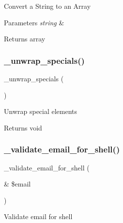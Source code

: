 Convert a String to an Array


\begin{DoxyParams}{Parameters}
{\em string} & \\
\hline
\end{DoxyParams}
\begin{DoxyReturn}{Returns}
array 
\end{DoxyReturn}
\mbox{\label{class_c_i___email_af50bcab235f0eff47d7117d77733f1d9}} 
\subsubsection{\texorpdfstring{\+\_\+unwrap\+\_\+specials()}{\_unwrap\_specials()}}
{\footnotesize\ttfamily \+\_\+unwrap\+\_\+specials (\begin{DoxyParamCaption}{ }\end{DoxyParamCaption})\hspace{0.3cm}{\ttfamily [protected]}}

Unwrap special elements

\begin{DoxyReturn}{Returns}
void 
\end{DoxyReturn}
\mbox{\label{class_c_i___email_a468f4ab8b122318d39baffe9e727d2be}} 
\subsubsection{\texorpdfstring{\+\_\+validate\+\_\+email\+\_\+for\+\_\+shell()}{\_validate\_email\_for\_shell()}}
{\footnotesize\ttfamily \+\_\+validate\+\_\+email\+\_\+for\+\_\+shell (\begin{DoxyParamCaption}\item[{\&}]{\$email }\end{DoxyParamCaption})\hspace{0.3cm}{\ttfamily [protected]}}

Validate email for shell

